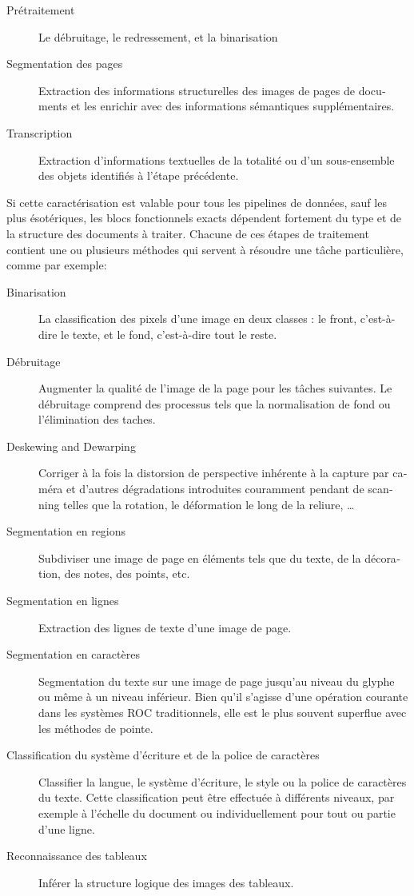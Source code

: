\begin{french}
\begin{description}
\item [Prétraitement] Le débruitage, le redressement, et la binarisation
\item [Segmentation des pages] Extraction des informations structurelles des
images de pages de documents et les enrichir avec des informations sémantiques
supplémentaires.
\item [Transcription] Extraction d'informations textuelles de la totalité ou
d'un sous-ensemble des objets identifiés à l'étape précédente.
\end{description}

Si cette caractérisation est valable pour tous les pipelines de données, sauf
les plus ésotériques, les blocs fonctionnels exacts dépendent fortement du type
et de la structure des documents à traiter. Chacune de ces étapes de traitement
contient une ou plusieurs méthodes qui servent à résoudre une tâche
particulière, comme par exemple:

\begin{description}
\item [Binarisation] La classification des pixels d'une image en deux classes :
le front, c'est-à-dire le texte, et le fond, c'est-à-dire tout le
reste.
\item [Débruitage] Augmenter la qualité de l'image de la page pour les tâches
	suivantes. Le débruitage comprend des processus tels que la
		normalisation de fond ou l'élimination des taches.
\item [Deskewing and Dewarping] Corriger à la fois la distorsion de perspective
	inhérente à la capture par caméra et d'autres dégradations introduites
couramment pendant de scanning telles que la
rotation, le déformation le long de la reliure, \dots
\item [Segmentation en regions]  Subdiviser une image de page en éléments tels que du texte, de la décoration, des notes, des points, etc.
\item [Segmentation en lignes] Extraction des lignes de texte d'une image de page.
\item [Segmentation en caractères] Segmentation du texte sur une image de page
	jusqu'au niveau du glyphe ou même à un niveau inférieur. Bien qu'il
		s'agisse d'une opération courante dans les systèmes ROC
		traditionnels, elle est le plus souvent superflue avec les
		méthodes de pointe.
\item [Classification du système d'écriture et de la police de caractères] Classifier la langue, le système d'écriture, le style ou la police de
caractères du texte. Cette classification peut être effectuée à
différents niveaux, par exemple à l'échelle du document ou
individuellement pour tout ou partie d'une ligne.
\item [Reconnaissance des tableaux] Inférer la structure logique des images des tableaux.
\end{description}


\end{french}
